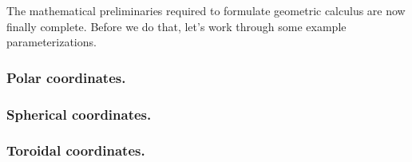 %
%
The mathematical preliminaries required to formulate geometric calculus are now finally complete.
Before we do that, let's work through some example parameterizations.

\subsubsection{Polar coordinates.}
   

\subsubsection{Spherical coordinates.}
   

\subsubsection{Toroidal coordinates.}
   

